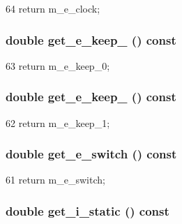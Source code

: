 \begin{DoxyCode}
64 { return m_e_clock; }
\end{DoxyCode}
\hypertarget{classFlipFlop_ac83321c56f433dfeeae891310348b961}{
\subsubsection[{get\_\-e\_\-keep\_\-0}]{\setlength{\rightskip}{0pt plus 5cm}double get\_\-e\_\-keep\_ () const}}
\label{classFlipFlop_ac83321c56f433dfeeae891310348b961}



\begin{DoxyCode}
63 { return m_e_keep_0; }
\end{DoxyCode}
\hypertarget{classFlipFlop_a4c1b6018bc8cfbbb59802749c25d2fc7}{
\subsubsection[{get\_\-e\_\-keep\_\-1}]{\setlength{\rightskip}{0pt plus 5cm}double get\_\-e\_\-keep\_ () const}}
\label{classFlipFlop_a4c1b6018bc8cfbbb59802749c25d2fc7}



\begin{DoxyCode}
62 { return m_e_keep_1; }
\end{DoxyCode}
\hypertarget{classFlipFlop_a9872d2437aa4caa945007936b10becb1}{
\subsubsection[{get\_\-e\_\-switch}]{\setlength{\rightskip}{0pt plus 5cm}double get\_\-e\_\-switch () const}}
\label{classFlipFlop_a9872d2437aa4caa945007936b10becb1}



\begin{DoxyCode}
61 { return m_e_switch; }
\end{DoxyCode}
\hypertarget{classFlipFlop_af4ce13e52cccc034f4f0bb0f0a6c9468}{
\subsubsection[{get\_\-i\_\-static}]{\setlength{\rightskip}{0pt plus 5cm}double get\_\-i\_\-static () const}}
\label{classFlipFlop_af4ce13e52cccc034f4f0bb0f0a6c9468}



